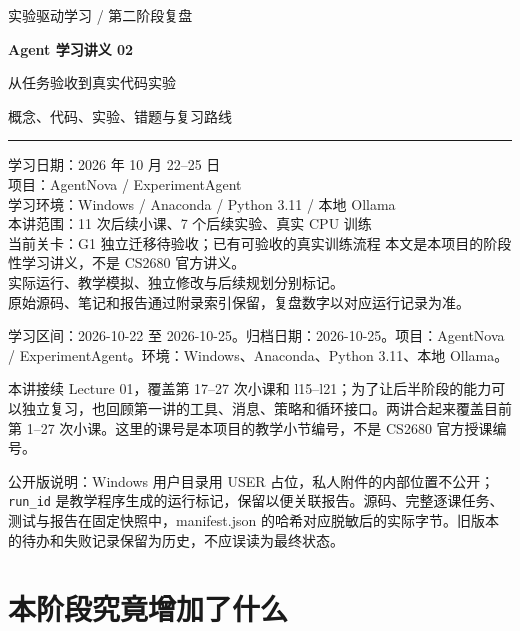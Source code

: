\documentclass[UTF8,zihao=-4,fontset=fandol]{ctexart}
\begin{document}
\hypersetup{pageanchor=false}
\begin{titlepage}
\vspace*{14mm}
{\large\color{Accent}实验驱动学习 / 第二阶段复盘\par}
\vspace{10mm}
{\Huge\bfseries\color{Ink}Agent 学习讲义 02\par}
\vspace{6mm}
{\LARGE 从任务验收到真实代码实验\par}
\vspace{12mm}
{\large 概念、代码、实验、错题与复习路线\par}
\vspace{14mm}
\hrule
\vspace{6mm}
学习日期：2026 年 10 月 22--25 日\\
项目：AgentNova / ExperimentAgent\\
学习环境：Windows / Anaconda / Python 3.11 / 本地 Ollama\\
本讲范围：11 次后续小课、7 个后续实验、真实 CPU 训练\\
当前关卡：G1 独立迁移待验收；已有可验收的真实训练流程
\vfill
\small
本文是本项目的阶段性学习讲义，不是 CS2680 官方讲义。\\
实际运行、教学模拟、独立修改与后续规划分别标记。\\
原始源码、笔记和报告通过附录索引保留，复盘数字以对应运行记录为准。
\end{titlepage}
\hypersetup{pageanchor=true}
\tableofcontents
\clearpage
{}

学习区间：2026-10-22 至 2026-10-25。归档日期：2026-10-25。项目：AgentNova / ExperimentAgent。环境：Windows、Anaconda、Python 3.11、本地 Ollama。

本讲接续 Lecture 01，覆盖第 17–27 次小课和 l15–l21；为了让后半阶段的能力可以独立复习，也回顾第一讲的工具、消息、策略和循环接口。两讲合起来覆盖目前第 1–27 次小课。这里的课号是本项目的教学小节编号，不是 CS2680 官方授课编号。

公开版说明：Windows 用户目录用 USER 占位，私人附件的内部位置不公开；\nolinkurl{run_id} 是教学程序生成的运行标记，保留以便关联报告。源码、完整逐课任务、测试与报告在固定快照中，manifest.json 的哈希对应脱敏后的实际字节。旧版本的待办和失败记录保留为历史，不应误读为最终状态。

\section{本阶段究竟增加了什么}
\end{document}

